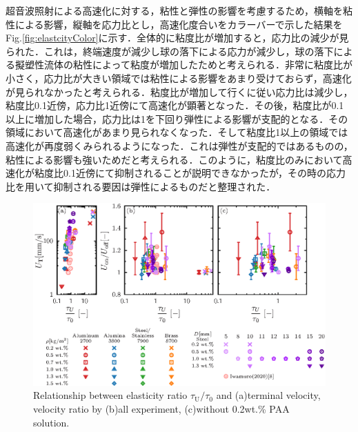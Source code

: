 超音波照射による高速化に対する，粘性と弾性の影響を考慮するため，横軸を粘性による影響，縦軸を応力比とし，高速化度合いをカラーバーで示した結果をFig.\ref{fig:elastcityColor}に示す．全体的に粘度比が増加すると，応力比の減少が見られた．これは，終端速度が減少し球の落下による応力が減少し，球の落下による擬塑性流体の粘性によって粘度が増加したためと考えられる．非常に粘度比が小さく，応力比が大きい領域では粘性による影響をあまり受けておらず，高速化が見られなかったと考えられる．粘度比が増加して行くに従い応力比は減少し，粘度比0.1近傍，応力比1近傍にて高速化が顕著となった．その後，粘度比が0.1以上に増加した場合，応力比は1を下回り弾性による影響が支配的となる．その領域において高速化があまり見られなくなった．そして粘度比1以上の領域では高速化が再度弱くみられるようになった．これは弾性が支配的ではあるものの，粘性による影響も強いためだと考えられる．このように，粘度比のみにおいて高速化が粘度比0.1近傍にて抑制されることが説明できなかったが，その時の応力比を用いて抑制される要因は弾性によるものだと整理された．

\begin{figure}[h]
    \centering
    \includegraphics[width=1.0\textwidth]{5-Results/elastcity.eps}
    \caption{Relationship between elasticity ratio $\tau_\text{U}/\tau_\text{0}$ and (a)terminal velocity, velocity ratio by (b)all experiment, (c)without 0.2wt.\% PAA solution.}
    \label{fig:elastcity}
\end{figure}

